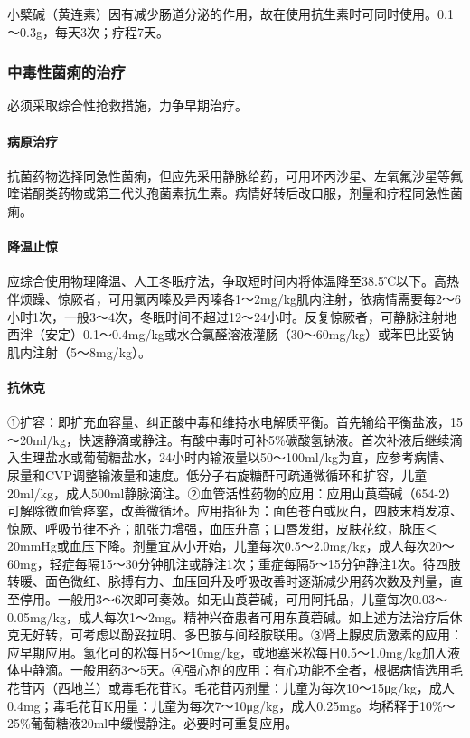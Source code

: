 小檗碱（黄连素）因有减少肠道分泌的作用，故在使用抗生素时可同时使用。0.1～0.3g，每天3次；疗程7天。

\subsubsection{中毒性菌痢的治疗}

必须采取综合性抢救措施，力争早期治疗。

\paragraph{病原治疗}

抗菌药物选择同急性菌痢，但应先采用静脉给药，可用环丙沙星、左氧氟沙星等氟喹诺酮类药物或第三代头孢菌素抗生素。病情好转后改口服，剂量和疗程同急性菌痢。

\paragraph{降温止惊}

应综合使用物理降温、人工冬眠疗法，争取短时间内将体温降至38.5℃以下。高热伴烦躁、惊厥者，可用氯丙嗪及异丙嗪各1～2mg/kg肌内注射，依病情需要每2～6小时1次，一般3～4次，冬眠时间不超过12～24小时。反复惊厥者，可静脉注射地西泮（安定）0.1～0.4mg/kg或水合氯醛溶液灌肠（30～60mg/kg）或苯巴比妥钠肌内注射（5～8mg/kg）。

\paragraph{抗休克}

①扩容：即扩充血容量、纠正酸中毒和维持水电解质平衡。首先输给平衡盐液，15～20ml/kg，快速静滴或静注。有酸中毒时可补5\%碳酸氢钠液。首次补液后继续滴入生理盐水或葡萄糖盐水，24小时内输液量以50～100ml/kg为宜，应参考病情、尿量和CVP调整输液量和速度。低分子右旋糖酐可疏通微循环和扩容，儿童20ml/kg，成人500ml静脉滴注。②血管活性药物的应用：应用山莨菪碱（654-2）可解除微血管痉挛，改善微循环。应用指征为：面色苍白或灰白，四肢末梢发凉、惊厥、呼吸节律不齐；肌张力增强，血压升高；口唇发绀，皮肤花纹，脉压＜
20mmHg或血压下降。剂量宜从小开始，儿童每次0.5～2.0mg/kg，成人每次20～60mg，轻症每隔15～30分钟肌注或静注1次；重症每隔5～15分钟静注1次。待四肢转暖、面色微红、脉搏有力、血压回升及呼吸改善时逐渐减少用药次数及剂量，直至停用。一般用3～6次即可奏效。如无山莨菪碱，可用阿托品，儿童每次0.03～0.05mg/kg，成人每次1～2mg。精神兴奋患者可用东莨菪碱。如上述方法治疗后休克无好转，可考虑以酚妥拉明、多巴胺与间羟胺联用。③肾上腺皮质激素的应用：应早期应用。氢化可的松每日5～10mg/kg，或地塞米松每日0.5～1.0mg/kg加入液体中静滴。一般用药3～5天。④强心剂的应用：有心功能不全者，根据病情选用毛花苷丙（西地兰）或毒毛花苷K。毛花苷丙剂量：儿童为每次10～15μg/kg，成人0.4mg；毒毛花苷K用量：儿童为每次7～10μg/kg，成人0.25mg。均稀释于10\%～25\%葡萄糖液20ml中缓慢静注。必要时可重复应用。

